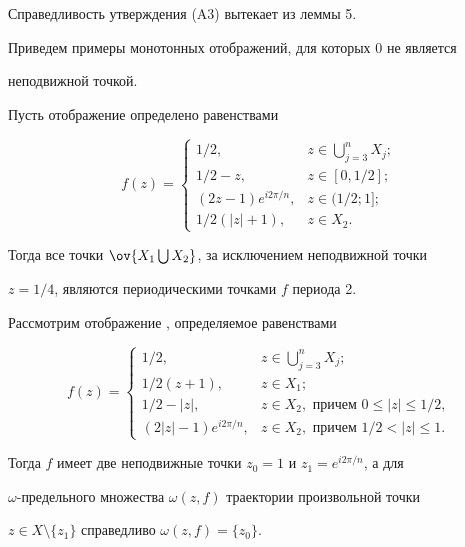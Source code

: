 Справедливость утверждения (A3) вытекает из леммы 5.





Приведем примеры монотонных отображений, для которых $0$ не является


неподвижной точкой.





\begin{exam} Пусть отображение \fm  определено равенствами


$$


f(z)=


\begin{cases}


1/2, &z\in \bigcup\limits_{j=3}^{n}X_j;\\


1/2 -z, &z\in [0,1/2];\\


(2z-1)e^{i 2\pi/n}, &z\in (1/2; 1];\\


1/2 (|z|+1), &z\in X_2.


\end{cases}


$$


Тогда все точки $\ov{X_1\bigcup X_2}$, за исключением неподвижной точки


$z=1/4$, являются периодическими точками $f$ периода 2.


\end{exam}





\begin{exam} Рассмотрим отображение \fm{}, определяемое равенствами


$$


f(z)=\begin{cases}


1/2, &z\in \bigcup\limits_{j=3}^{n}X_j;\\


1/2 (z+1), & z\in X_1;\\


1/2 -|z|, & z\in X_2,\text{ причем } 0\le|z|\le 1/2,\\


(2|z|-1)e^{i 2\pi /n}, &z\in X_2,\text{ причем } 1/2 <|z|\le 1.


\end{cases}


$$


Тогда $f$ имеет две неподвижные точки $z_0=1$ и $z_1=e^{i 2\pi/n}$, а для


$\omega$-предельного множества $\omega (z,f)$ траектории произвольной точки


$z\in X\setminus \{z_1\}$ справедливо $\omega (z,f)=\{z_0\}$.


\end{exam}





